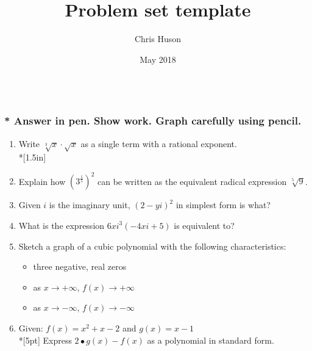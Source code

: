 \documentclass[12pt, oneside]{article}
\title{Problem set template}
\author{Chris Huson}
\date{May 2018}
\begin{document}

\subsubsection*{\\* \textnormal{Answer in pen. Show work. Graph carefully using pencil.}}

\begin{enumerate}

\item Write $\sqrt[3]x \cdot \sqrt{x}$ as a single term with a rational exponent. %
\\*[1.5in]

\item Explain how $\displaystyle \left(3^{\frac{1}{5}} \right)^2$ can be written as the equivalent radical expression $\sqrt[5]9$. \\[1.5in]%


\item Given $i$ is the imaginary unit, $(2-yi)^2$ in simplest form is what? \\[1.5in]%

\item What is the expression $6xi^3(-4xi+5)$ is equivalent to?  %


\newpage
\item Sketch a graph of a cubic polynomial with the following characteristics: 
\begin{itemize}
\item three negative, real zeros
\item as $x \rightarrow + \infty$, $f(x) \rightarrow + \infty$
\item as $x \rightarrow - \infty$, $f(x) \rightarrow - \infty$
\end{itemize}
\begin{center}
\end{center} %

\item Given: $f(x)=x^2+ x - 2$ and $g(x)=x-1$\\*[5pt]
Express $2 \bullet g(x) - f(x)$ as a polynomial in standard form. \\[3in] %


\end{enumerate}
\end{document}
